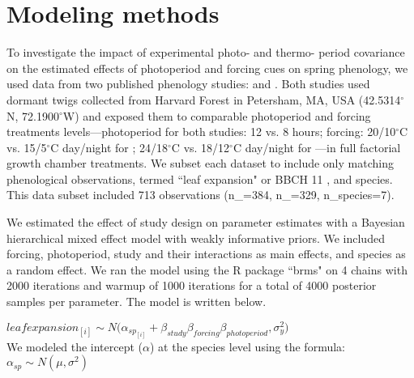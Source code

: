 \documentclass[11pt]{article}
\begin{document}
\section*{Modeling methods}
To investigate the impact of experimental photo- and thermo- period covariance on the estimated effects of photoperiod and forcing cues on spring phenology, we used data from two published phenology studies: \cite{Flynn2018} and \cite{Buonaiuto:2021ug}. Both studies used dormant twigs collected from Harvard Forest in Petersham, MA, USA (42.5314$^{\circ}$N, 72.1900$^{\circ}$W)  and exposed them to comparable photoperiod and forcing treatments levels---photoperiod for both studies: 12 vs. 8 hours; forcing: 20/10$^{\circ}$C vs. 15/5$^{\circ}$C day/night for \citet{Flynn2018}; 24/18$^{\circ}$C vs. 18/12$^{\circ}$C day/night for \citet{Buonaiuto:2021ug}---in full factorial growth chamber treatments. We subset each dataset to include only matching phenological observations, termed ``leaf expansion" or BBCH 11 \citep{Finn2007}, and species. This data subset included 713 observations (n_{\cite{Flynn2018}}=384, n_{\cite{Buonaiuto:2021ug}}=329, n_{species}=7).

We estimated the effect of study design on parameter estimates with a Bayesian hierarchical mixed effect model with weakly informative priors. %
We included forcing, photoperiod, study and their interactions as main effects, and species as a random effect. We ran the model using the R package ``brms" \citep{Burkner2018} on 4 chains with 2000 iterations and warmup of 1000 iterations for a total of 4000 posterior samples per parameter. The model is written below.

$leafexpansion_{[i]} \sim N(\alpha_{sp_{[i]}}+\beta_{study} $\times$ \beta_{forcing} $\times$ \beta_{photoperiod}, \sigma_y^2)$\\

 We modeled the intercept ($\alpha$) at the species level using the formula:\\

$\alpha_{sp} \sim N(\mu,\sigma^2)$\\

\end{document}
